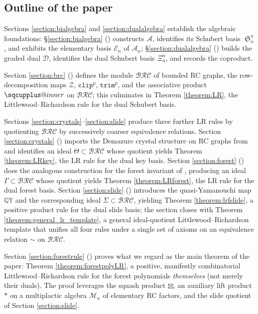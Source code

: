 \documentclass[a4paper,fleqn]{cas-sc}
\makeatletter
\newcommand{\sqcupplus@inner}[2]{%
  \vcenter{\hbox{\ooalign{%
    \hfil$\m@th#1\sqcup$\hfil\cr
    \hfil\raisebox{0.15ex}{$\m@th#1\scriptscriptstyle+$}\hfil\cr
  }}}%
}
\newcommand{\sqcupplus}{\mathbin{\mathpalette\sqcupplus@inner\relax}}
\theoremstyle{definition}
\theoremstyle{remark}
\numberwithin{equation}{subsection}
\DeclareMathOperator{\sch}{\mathfrak{S}}
\newcommand{\QY}{\ensuremath{\mathbb{QY}}}
\newcommand{\trm}{\mathtt{trim}}
\newcommand{\zeromap}{\mathcal{Z}}
\newcommand{\clp}{\mathtt{clip}}
\newcommand{\BRC}{\mathcal{BRC}}
\newcommand{\dsch}{\ensuremath{\Xi}}
\newcommand{\coma}{\mathcal{A}}
\newcommand{\dcoma}{\mathcal{D}}
\makeatother
\begin{document}
\subsection*{Outline of the paper}

Sections \ref{section:bialgebra} and \ref{section:dualalgebra} establish the algebraic foundations: \S\ref{section:bialgebra} () constructs $\coma$, identifies its Schubert basis $\sch_u^n$, and exhibits the elementary basis $\mathcal{E}_n$ of $\coma_n$; \S\ref{section:dualalgebra} () builds the graded dual $\dcoma$, identifies the dual Schubert basis $\dsch_u^n$, and records the coproduct.

Section \ref{section:brc} () defines the module $\BRC$ of bounded RC graphs, the row-decomposition maps $\zeromap$, $\clp^p$, $\trm^p$, and the associative product $\sqcupplus$ on $\BRC$; this culminates in Theorem \ref{theorem:LR}, the Littlewood--Richardson rule for the dual Schubert basis.

Sections \ref{section:crystals}--\ref{section:slide} produce three further LR rules by quotienting $\BRC$ by successively coarser equivalence relations. Section \ref{section:crystals} () imports the Demazure crystal structure on RC graphs from \cite{assaf2018demazure} and identifies an ideal $\Theta\subset\BRC$ whose quotient yields Theorem \ref{theorem:LRkey}, the LR rule for the dual key basis. Section \ref{section:forest} () does the analogous construction for the forest invariant of \cite{nadeau2024forest}, producing an ideal $\Gamma\subset\BRC$ whose quotient yields Theorem \ref{theorem:LRforest}, the LR rule for the dual forest basis. Section \ref{section:slide} () introduces the quasi-Yamanouchi map $\QY$ and the corresponding ideal $\Sigma\subset\BRC$, yielding Theorem \ref{theorem:lrfslide}, a positive product rule for the dual slide basis; the section closes with Theorem \ref{theorem:general_lr_template}, a general ideal-quotient Littlewood--Richardson template that unifies all four rules under a single set of axioms on an equivalence relation $\sim$ on $\BRC$.

Section \ref{section:forestrule} () proves what we regard as the main theorem of the paper: Theorem \ref{theorem:forestpolyLR}, a positive, manifestly combinatorial Littlewood--Richardson rule for the forest polynomials \emph{themselves} (not merely their duals). The proof leverages the squash product $\boxtimes$, an auxiliary lift product $*$ on a multiplactic algebra $\mathcal{M}_n$ of elementary RC factors, and the slide quotient of Section \ref{section:slide}.
\end{document}
